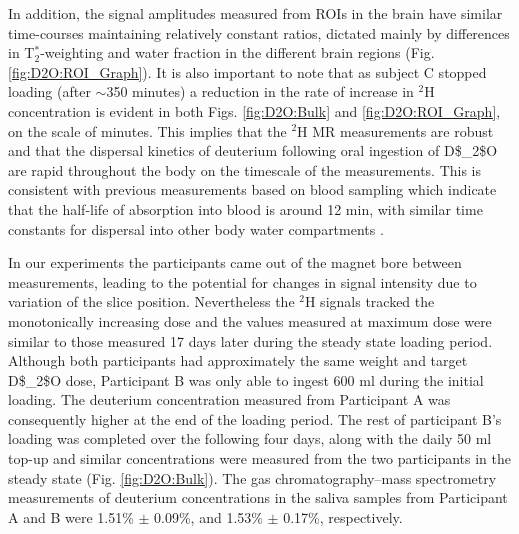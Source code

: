 In addition, the signal amplitudes measured from \ac{ROI}s in the brain have similar time-courses maintaining relatively constant ratios, dictated mainly by differences in T$_2^*$-weighting and water fraction in the different brain regions (Fig. \ref{fig:D2O:ROI_Graph}). It is also important to note that as subject C stopped loading (after $\sim$350 minutes) a reduction in the rate of increase in $^2$H concentration is evident in both Figs. \ref{fig:D2O:Bulk} and \ref{fig:D2O:ROI_Graph}, on the scale of minutes. This implies that the $^2$H MR measurements are robust and that the dispersal kinetics of deuterium following oral ingestion of \ac{D$_2$O} are rapid throughout the body on the timescale of the measurements. This is consistent with previous measurements based on blood sampling which indicate that the half-life of absorption into blood is around 12 min, with similar time constants for dispersal into other body water compartments \cite{Davies2001RapidWater,Peronnet2012PharmacokineticHumans}. 

In our experiments the participants came out of the magnet bore between measurements, leading to the potential for changes in signal intensity due to variation of the slice position. Nevertheless the $^2$H signals tracked the monotonically increasing dose and the values measured at maximum dose were similar to those measured 17 days later during the steady state loading period. Although both participants had approximately the same weight and target \ac{D$_2$O} dose, Participant B was only able to ingest 600 ml during the initial loading. The deuterium concentration measured from Participant A was consequently higher at the end of the loading period. The rest of participant B’s loading was completed over the following four days, along with the daily 50 ml top-up and similar concentrations were measured from the two participants in the steady state (Fig. \ref{fig:D2O:Bulk}). The gas chromatography–mass spectrometry measurements of deuterium concentrations in the saliva samples from Participant A and B were 1.51\% $\pm$ 0.09\%, and 1.53\% $\pm$ 0.17\%, respectively. 

